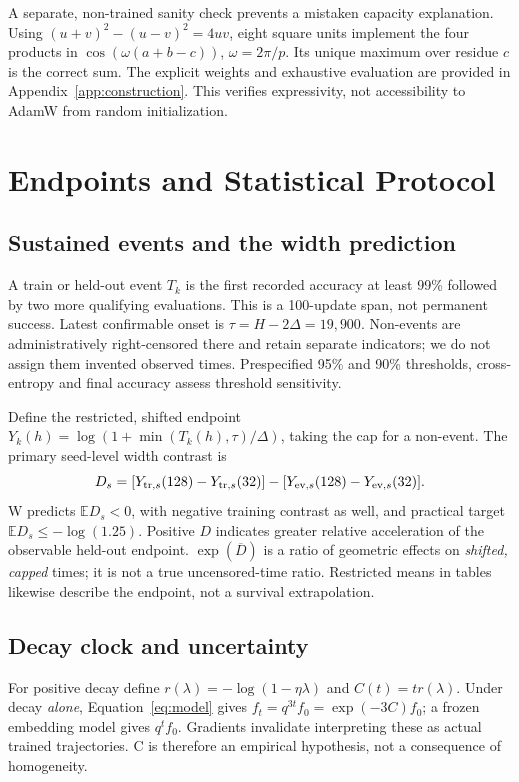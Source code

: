 \documentclass{article}
\begin{document}
A separate, non-trained sanity check prevents a mistaken capacity explanation. Using $(u+v)^2-(u-v)^2=4uv$, eight square units implement the four products in $\cos(\omega(a+b-c))$, $\omega=2\pi/p$. Its unique maximum over residue $c$ is the correct sum. The explicit weights and exhaustive evaluation are provided in Appendix~\ref{app:construction}. This verifies expressivity, not accessibility to AdamW from random initialization.

\section{Endpoints and Statistical Protocol}
\subsection{Sustained events and the width prediction}
A train or held-out event $T_k$ is the first recorded accuracy at least 99\% followed by two more qualifying evaluations. This is a 100-update span, not permanent success. Latest confirmable onset is $\tau=H-2\Delta=19{,}900$. Non-events are administratively right-censored there and retain separate indicators; we do not assign them invented observed times. Prespecified 95\% and 90\% thresholds, cross-entropy and final accuracy assess threshold sensitivity.

Define the restricted, shifted endpoint $Y_k(h)=\log(1+\min(T_k(h),\tau)/\Delta)$, taking the cap for a non-event. The primary seed-level width contrast is
\begin{equation}
 D_s=[Y_{{\rm tr},s}(128)-Y_{{\rm tr},s}(32)]-[Y_{{\rm ev},s}(128)-Y_{{\rm ev},s}(32)]. \label{eq:width}
\end{equation}
W predicts $\mathbb E D_s<0$, with negative training contrast as well, and practical target $\mathbb E D_s\le-\log(1.25)$. Positive $D$ indicates greater relative acceleration of the observable held-out endpoint. $\exp(\overline D)$ is a ratio of geometric effects on \emph{shifted, capped} times; it is not a true uncensored-time ratio. Restricted means in tables likewise describe the endpoint, not a survival extrapolation.

\subsection{Decay clock and uncertainty}
For positive decay define $r(\lambda)=-\log(1-\eta\lambda)$ and $C(t)=tr(\lambda)$. Under decay \emph{alone}, Equation~\ref{eq:model} gives $f_t=q^{3t}f_0=\exp(-3C)f_0$; a frozen embedding model gives $q^t f_0$. Gradients invalidate interpreting these as actual trained trajectories. C is therefore an empirical hypothesis, not a consequence of homogeneity.
\end{document}
